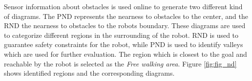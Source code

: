 Sensor information about obstacles is used online to generate two different kind of diagrams.
The PND represents the nearness to obstacles to the center, and the RND the nearness to obstacles to the robots boundary. 
These diagrams are used to categorize different regions in the surrounding of the robot.
RND is used to guarantee safety constraints for the robot, while PND is used to identify valleys which are used for further evaluation.
The region which is closest to the goal and reachable by the robot is selected as the \emph{Free walking area}.
Figure \ref{fig:fig_nd} shows identified regions and the corresponding diagrams.
\begin{figure}[thpb]
	  \myfloatalign
      \footnotesize
      \centering
    \\
\end{figure}
